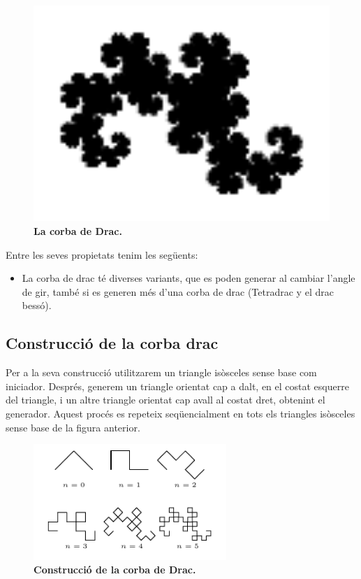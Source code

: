 \documentclass[12pt,a4paper]{report}
\begin{document}
\begin{figure}[!ht]
\centering
\includegraphics[width=1\textwidth]{img/img03_dragon_curve.pdf}
\caption{\textbf{La corba de Drac.} }
\end{figure}
Entre les seves propietats tenim les següents:
\begin{itemize}
\item La corba de drac té diverses variants, que es poden generar al cambiar l’angle de gir, també si es generen més d’una corba de drac (Tetradrac y el drac bessó).
\end{itemize}
\subsection{Construcció de la corba drac}
Per a la seva construcció utilitzarem un triangle isòsceles sense base com iniciador. Després, generem un triangle orientat cap a dalt, en el costat esquerre del triangle, i un altre triangle orientat cap avall al costat dret, obtenint el generador. Aquest procés es repeteix seqüencialment en tots els triangles isòsceles sense base de la figura anterior.
\begin{figure}[!ht]
\centering
\includegraphics[width=0.65\textwidth]{img/img03_dragon_curve_01.pdf}
\caption{\textbf{Construcció de la corba de Drac.} }
\end{figure}
\end{document}
